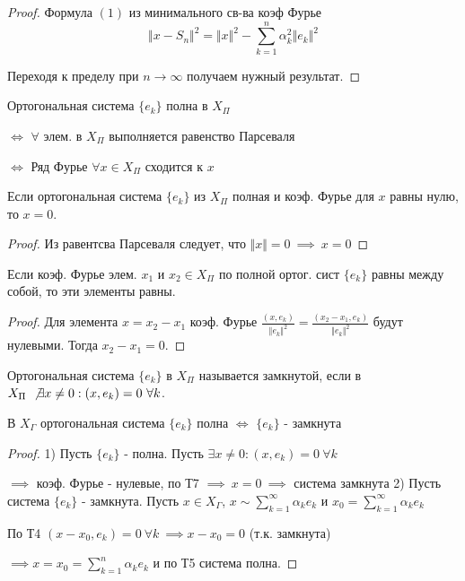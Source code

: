 \documentclass{article}
\begin{document}
\begin{proof}
  Формула $(1)$ из минимального св-ва коэф Фурье
  \[
    \Vert x-S_n \Vert^{2}=\Vert x \Vert^{2}-\sum_{k=1}^{n}\alpha_k^{2}\Vert e_k \Vert^{2}
  \]

  Переходя к пределу при $n\to\infty$ получаем нужный результат.
\end{proof}
\begin{corollary}
  Ортогональная система $\{e_k\}$ полна в $X_\Pi$ 

  $\iff$ $\forall $ элем. в $X_\Pi$ выполняется равенство Парсеваля 

  $\iff$ Ряд Фурье $\forall x \in X_\Pi$ сходится к $x$
\end{corollary}
\begin{theorem}[Т7]
  Если ортогональная система $\{e_k\}$ из $X_\Pi$ полная и коэф. Фурье для $x$ равны нулю,
  то $x = 0$.
\end{theorem}
\begin{proof}
  Из равентсва Парсеваля следует, что $\Vert x \Vert=0 \ \implies \ x=0$
\end{proof}
\begin{corollary}
  Если коэф. Фурье элем. $x_1$ и $x_2 \in X_\Pi$ по полной ортог. сист $\{e_k\}$
  равны между собой, то эти элементы равны.
\end{corollary}
\begin{proof}
Для элемента $x=x_2-x_1$ коэф. Фурье $\frac{(x,e_k)}{\Vert e_k \Vert^{2}}=\frac{(x_2-x_1,e_k)}{\Vert e_k \Vert^{2}}$
будут нулевыми. Тогда $x_2-x_1=0$.
\end{proof}
\begin{definition}
  Ортогональная система $\{e_k\}$ в $X_\Pi$ называется замкнутой, если в $X_\Pi \ \not \exists x\neq 0: (x,e_k)=0 \ \forall k$.
\end{definition}
\begin{theorem}
  В $X_\Gamma$ ортогональная система $\{e_k\}$ полна 
  $\iff$ $\{e_k\}$ - замкнута
\end{theorem}
\begin{proof}
  1) Пусть $\{e_k\}$ - полна. Пусть $\exists x \neq 0: (x,e_k)=0\ \forall k$

  $\implies$ коэф. Фурье - нулевые, по Т7 $\implies \ x= 0 \ \implies$ система замкнута
  2) Пусть система $\{e_k\}$ - замкнута. Пусть $x\in X_\Gamma$, $x \sim \sum_{k=1}^{\infty}\alpha_ke_k$ 
  и $x_0 = \sum_{ k=1}^{\infty}\alpha_ke_k$

  По Т4 $(x-x_0,e_k)=0 \ \forall k \ \implies x-x_0=0$ (т.к. замкнута)

  $\implies x = x_0 = \sum_{k=1}^{n}\alpha_ke_k$ и по Т5 система полна.
\end{proof}
\end{document}
